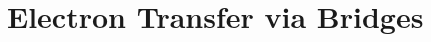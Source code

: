 \documentclass[12pt,twoside,a4paper]{report}
\begin{document}





\chapter{Electron Transfer via Bridges} \label{ET-via-bridges}          
%
\end{document}
